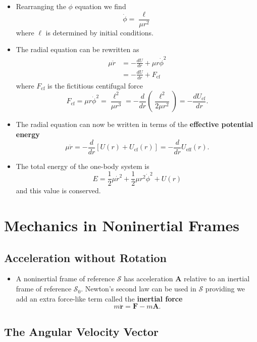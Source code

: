 \documentclass{article}
\renewcommand{\vec}[1]{\boldsymbol{\mathbf{#1}}}
\newcommand{\ddvec}[1]{\ddot{\vec{#1}}}
\begin{document}
\begin{itemize}
  \item Rearranging the $\phi$ equation we find \[\dot{\phi} = \frac{\ell}{\mu r^2}\] where $\ell$ is determined by initial conditions.

  \item The radial equation can be rewritten as \begin{align*}
          \mu \ddot{r} & = -\frac{d U}{d r} + \mu r \dot{\phi}^2 \\
                       & = -\frac{d U}{d r} + F_\text{cf}
        \end{align*} where $F_\text{cf}$ is the fictitious centifugal force \[F_\text{cf} = \mu r \dot{\phi}^2 = \frac{\ell^2}{\mu r^3} = -\frac{d}{d r} \left( \frac{\ell^2}{2 \mu r^2} \right) = -\frac{d U_\text{cf}}{d r}.\]

  \item The radial equation can now be written in terms of the \textbf{effective potential energy} \[\mu \ddot{r} = -\frac{d}{d r} [U(r) + U_\text{cf}(r)] = -\frac{d}{d r} U_\text{eff}(r).\]

  \item The total energy of the one-body system is \[E = \frac{1}{2} \mu \dot{r}^2 + \frac{1}{2} \mu r^2 \dot{\phi}^2 + U(r)\] and this value is conserved.
\end{itemize}

\section{Mechanics in Noninertial Frames}

\subsection{Acceleration without Rotation}

\begin{itemize}
  \item A noninertial frame of reference $\mathcal{S}$ has acceleration $\vec{A}$ relative to an inertial frame of reference $\mathcal{S}_0$. Newton's second law can be used in $\mathcal{S}$ providing we add an extra force-like term called the \textbf{inertial force} \[m \ddvec{r} = \vec{F} - m \vec{A}.\]
\end{itemize}

\setcounter{subsection}{2}
\subsection{The Angular Velocity Vector}
\end{document}
